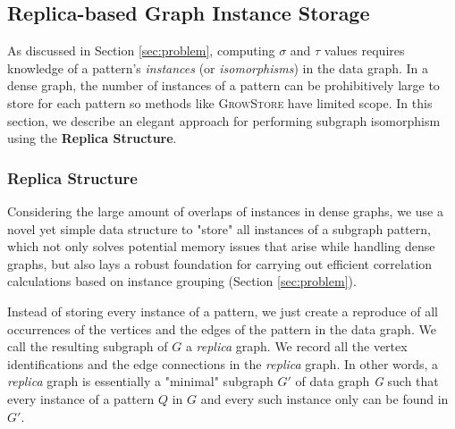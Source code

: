 

\subsection{Replica-based Graph Instance Storage}
\label{subsec:replica-storage}
As discussed in Section \ref{sec:problem}, computing $\sigma$ and $\tau$
values requires knowledge of a pattern's \emph
{instances} (or \emph{isomorphisms}) in the
data graph. In a dense graph, the number of instances of a pattern can be
prohibitively large to store for each pattern so methods like \textsc{GrowStore} have limited
scope. In this section, we describe an elegant approach for performing subgraph
isomorphism using the \textbf{Replica Structure}.

\subsubsection{Replica Structure}
\label{subsubsec:replica-ds}
 Considering the large amount of overlaps of instances in dense graphs,
 we use a novel yet simple data structure to "store" all instances of a subgraph
 pattern, which not only solves potential memory issues that arise while
 handling dense graphs, but also lays a robust foundation for carrying out
 efficient correlation calculations based on instance grouping (Section \ref{sec:problem}).
\par Instead of storing every instance of a pattern, we just create a reproduce
 of all occurrences of the vertices and the edges of the pattern in the data graph. We call the
 resulting subgraph of $G$ a \textit{replica} graph. We record all the vertex identifications
 and the edge connections in the \textit{replica} graph. In other words, a \textit{replica} graph is essentially a
 "minimal" subgraph ${G'}$ of data graph \textit{G} such that every
 instance of a pattern $Q$ in $G$ and every such instance only can be found in
 $G'$.

